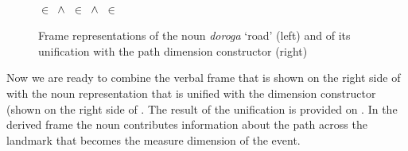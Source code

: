 \begin{figure}\small
\hfill%
\hfill%
\begin{minipage}{0.275\textwidth}
\smallskip\\
 $\in$  $\,\wedge\,$  $\in$  $\,\wedge\,$  $\in$ 
\end{minipage}
\caption{Frame representations of the noun \textit{doroga} `road' (left) and of its unification with the path dimension constructor (right) \label{frame:road}}
\end{figure}

Now we are ready to combine the verbal frame that is shown on the right side of  with the noun representation that is unified with the dimension constructor (shown on the right side of . The result of the unification is provided on . In the derived frame the noun contributes information about the path across the landmark that becomes the measure dimension of the event.

